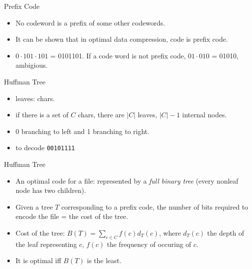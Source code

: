 \documentclass{beamer}
\begin{document}
\begin{frame}{}
\begin{center}
{\large Prefix Code}
\end{center}
\begin{itemize}
\item No codeword is a prefix of some other codewords.
\item It can be shown that in optimal data compression, code is prefix code.  
\item $0\cdot 101\cdot 101$ = 0101101.  If a code word is not prefix code,
$01\cdot 010$ = 01010, ambigious.  
\end{itemize}
\end{frame}

\begin{frame}{}
\end{frame}

\begin{frame}{}
\begin{center}
{\large Huffman Tree}
\end{center}
\begin{itemize}
\item leaves: chars.
\item if there is a set of $C$ chars, there are $|C|$ leaves, $|C|-1$ 
 internal nodes.  
\item 0 branching to left and 1 branching to right.  
\item to decode {\tt 00101111}
\end{itemize}
\end{frame}

\begin{frame}{}
\begin{center}
{\large Huffman Tree}
\end{center}
\begin{itemize}
\item An optimal code for a file: represented by a {\it full binary tree}
 (every nonleaf node has two children).
\item Given a tree $T$ corresponding to a prefix code, the number of bits
 required to encode the file = the cost of the tree.  
\item Cost of the tree: $B(T)=\sum_{c\in C}f(c)d_T(c)$, where $d_T(c)$ the
 depth of the leaf representing $c$, $f(c)$ the frequency of occuring of $c$.
\item It is optimal iff $B(T)$ is the least.  
\end{itemize}
\end{frame}
\end{document}
